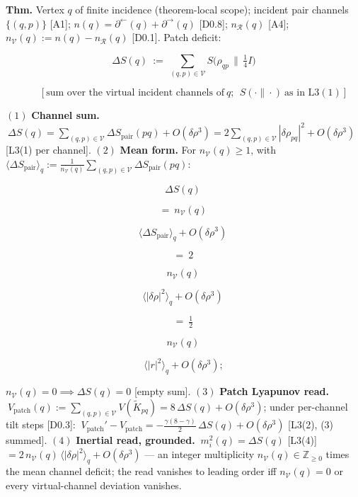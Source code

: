 \begin{theorem}\label{tag:L4}
\textbf{Thm.} Vertex $q$ of finite incidence (theorem-local scope); incident pair channels $\{(q,p)\}$ [A1]; $n(q)=\partial^{\leftarrow}(q)+\partial^{\rightarrow}(q)$ [D0.8]; $n_{\mathcal R}(q)$ [A4]; $n_{\mathcal V}(q):=n(q)-n_{\mathcal R}(q)$ [D0.1]. Patch deficit:

\[
\Delta S(q)\ :=\ \sum_{(q,p)\in\mathcal V}S\bigl(\rho_{qp}\,\big\|\,\tfrac14I\bigr)
\]

\[
\qquad [\text{sum over the virtual incident channels of}\ q;\ \ S(\cdot\|\cdot)\ \text{as in L3}(1)]
\]

$(1)$ \textbf{Channel sum.} $\ \Delta S(q)=\sum_{(q,p)\in\mathcal V}\Delta S_{\mathrm{pair}}(pq)+O(\delta\rho^3)=2\sum_{(q,p)\in\mathcal V}|\delta\rho_{pq}|^2+O(\delta\rho^3)$ [L3(1) per channel]. $(2)$ \textbf{Mean form.} For $n_{\mathcal V}(q)\ge1$, with $\langle\Delta S_{\mathrm{pair}}\rangle_q:=\frac1{n_{\mathcal V}(q)}\sum_{(q,p)\in\mathcal V}\Delta S_{\mathrm{pair}}(pq)$:

\[
\Delta S(q)\
\]

\[
= \ n_{\mathcal V}(q)\,
\]

\[
\langle\Delta S_{\mathrm{pair}}\rangle_q+O(\delta\rho^3)\
\]

\[
= \ 2\,
\]

\[
n_{\mathcal V}(q)\,
\]

\[
\langle|\delta\rho|^2\rangle_q+O(\delta\rho^3)\
\]

\[
= \ \tfrac12\,
\]

\[
n_{\mathcal V}(q)\,
\]

\[
\langle|r|^2\rangle_q+O(\delta\rho^3);
\]

$n_{\mathcal V}(q)=0\implies\Delta S(q)=0$ [empty sum]. $(3)$ \textbf{Patch Lyapunov read.} $\ V_{\mathrm{patch}}(q):=\sum_{(q,p)\in\mathcal V}V(\tilde K_{pq})=8\,\Delta S(q)+O(\delta\rho^3)$; under per-channel tilt steps [D0.3]: $\ V_{\mathrm{patch}}'-V_{\mathrm{patch}}=-\frac{\gamma(8-\gamma)}2\,\Delta S(q)+O(\delta\rho^3)$ [L3(2), (3) summed]. $(4)$ \textbf{Inertial read, grounded.} $\ m_i^2(q)=\Delta S(q)$ [L3(4)] $=2\,n_{\mathcal V}(q)\,\langle|\delta\rho|^2\rangle_q+O(\delta\rho^3)$ — an integer multiplicity $n_{\mathcal V}(q)\in\mathbb Z_{\ge0}$ times the mean channel deficit; the read vanishes to leading order iff $n_{\mathcal V}(q)=0$ or every virtual-channel deviation vanishes.


\end{theorem}
